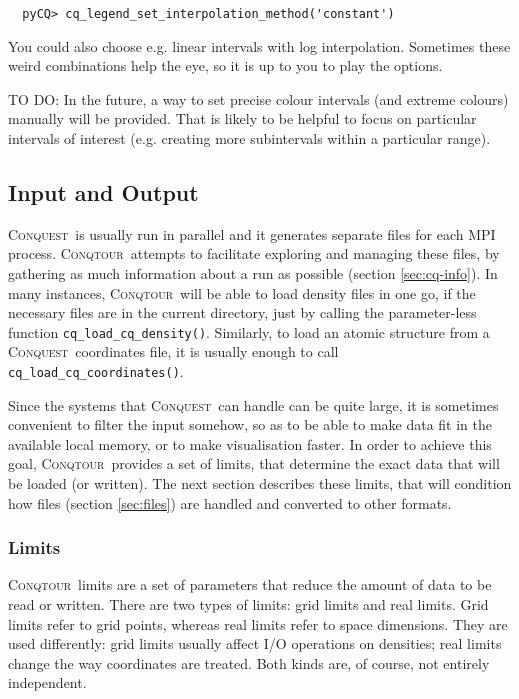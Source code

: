 \documentclass[a4paper,notitlepage,11pt]{article}
\def\CQ{\textsc{Conquest}}
\def\Conqtour{\textsc{Conqtour}}
\begin{document}
\begin{verbatim}
  pyCQ> cq_legend_set_interpolation_method('constant')
\end{verbatim}

You could also choose e.g. linear intervals with log interpolation. Sometimes
these weird combinations help the eye, so it is up to you to play the options.

TO DO: In the future, a way to set precise colour intervals (and extreme
colours) manually will be provided. That is likely to be helpful to focus on particular
intervals of interest (e.g. creating more subintervals within a particular
range).

\subsection{Input and Output}
\label{sec:input-output}

\CQ\ is usually run in parallel and it generates separate files for each MPI
process. \Conqtour\ attempts to facilitate exploring and managing these files,
by gathering as much information about a run as possible (section
\ref{sec:cq-info}). In many instances, \Conqtour\ will be able
to load density files in one go, if the necessary files are in the current
directory, just by calling the parameter-less function
\texttt{cq\_load\_cq\_density()}. Similarly, to load an atomic structure from a
\CQ\ coordinates file, it is usually enough to call
\texttt{cq\_load\_cq\_coordinates()}.

Since the systems that \CQ\ can handle can be quite large, it is sometimes
convenient to filter the input somehow, so as to be able to make data fit in the
available local memory, or to make visualisation faster. In order to achieve
this goal, \Conqtour\ provides a set of limits, that determine the exact data that
will be loaded (or written). The next section describes these limits, that will
condition how files (section \ref{sec:files}) are handled and converted to
other formats.

\subsubsection{Limits}
\label{sec:limits}

\Conqtour\ limits are a set of parameters that reduce the amount of data to be
read or written. There are two types of limits: grid limits and real limits.
Grid limits refer to grid points, whereas real limits refer to space dimensions.
They are used differently: grid limits usually affect I/O operations
on densities; real limits change the way coordinates are treated. Both kinds
are, of course, not entirely independent.
\end{document}
